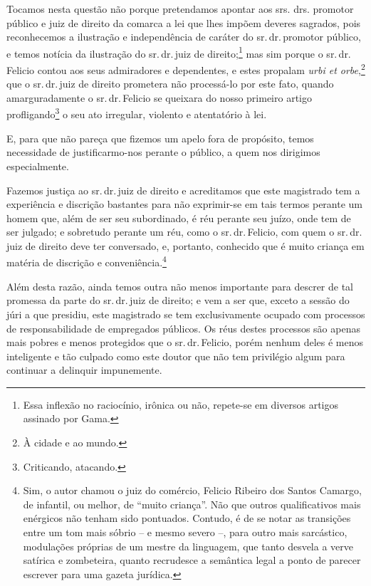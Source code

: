 Tocamos nesta questão não porque pretendamos apontar aos srs. drs.
promotor público e juiz de direito da comarca a lei que lhes impõem
deveres sagrados, pois reconhecemos a ilustração e independência de
caráter do sr.\,dr.\,promotor público, e temos notícia da ilustração do
sr.\,dr.\,juiz de direito;\footnote{ Essa inflexão no raciocínio, irônica
  ou não, repete-se em diversos artigos assinado por Gama.} mas sim
porque o sr.\,dr.\,Felicio contou aos seus admiradores e dependentes, e
estes propalam \emph{urbi et orbe},\footnote{ À cidade e ao mundo.} que
o sr.\,dr.\,juiz de direito prometera não processá-lo por este fato,
quando amarguradamente o sr.\,dr.\,Felicio se queixara do nosso primeiro
artigo profligando\footnote{ Criticando, atacando.} o seu ato
irregular, violento e atentatório à lei.

E, para que não pareça que fizemos um apelo fora de propósito, temos
necessidade de justificarmo-nos perante o público, a quem nos dirigimos
especialmente.

Fazemos justiça ao sr.\,dr.\,juiz de direito e acreditamos que este
magistrado tem a experiência e discrição bastantes para não exprimir-se
em tais termos perante um homem que, além de ser seu subordinado, é réu
perante seu juízo, onde tem de ser julgado; e sobretudo perante um réu,
como o sr.\,dr.\,Felicio, com quem o sr.\,dr.\,juiz de direito deve ter
conversado, e, portanto, conhecido que é muito criança em matéria de
discrição e conveniência.\footnote{ Sim, o autor chamou o juiz do
  comércio, Felicio Ribeiro dos Santos Camargo, de infantil, ou melhor,
  de ``muito criança''. Não que outros qualificativos mais enérgicos não
  tenham sido pontuados. Contudo, é de se notar as transições entre um
  tom mais sóbrio -- e mesmo severo --, para outro mais sarcástico,
  modulações próprias de um mestre da linguagem, que tanto desvela a
  verve satírica e zombeteira, quanto recrudesce a semântica legal a
  ponto de parecer escrever para uma gazeta jurídica.}

Além desta razão, ainda temos outra não menos importante para descrer de
tal promessa da parte do sr.\,dr.\,juiz de direito; e vem a ser que,
exceto a sessão do júri a que presidiu, este magistrado se tem
exclusivamente ocupado com processos de responsabilidade de empregados
públicos. Os réus destes processos são apenas mais pobres e menos
protegidos que o sr.\,dr.\,Felicio, porém nenhum deles é menos inteligente
e tão culpado como este doutor que não tem privilégio algum para
continuar a delinquir impunemente.

